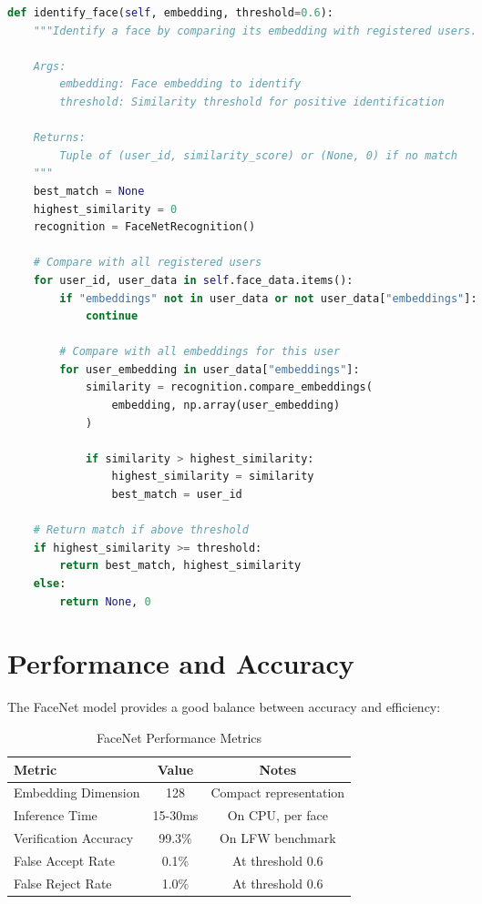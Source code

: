 \begin{lstlisting}[language=Python, caption=Face Identification Process]
def identify_face(self, embedding, threshold=0.6):
    """Identify a face by comparing its embedding with registered users.
    
    Args:
        embedding: Face embedding to identify
        threshold: Similarity threshold for positive identification
        
    Returns:
        Tuple of (user_id, similarity_score) or (None, 0) if no match
    """
    best_match = None
    highest_similarity = 0
    recognition = FaceNetRecognition()
    
    # Compare with all registered users
    for user_id, user_data in self.face_data.items():
        if "embeddings" not in user_data or not user_data["embeddings"]:
            continue
            
        # Compare with all embeddings for this user
        for user_embedding in user_data["embeddings"]:
            similarity = recognition.compare_embeddings(
                embedding, np.array(user_embedding)
            )
            
            if similarity > highest_similarity:
                highest_similarity = similarity
                best_match = user_id
    
    # Return match if above threshold
    if highest_similarity >= threshold:
        return best_match, highest_similarity
    else:
        return None, 0
\end{lstlisting}

\section{Performance and Accuracy}
The FaceNet model provides a good balance between accuracy and efficiency:

\begin{table}[H]
\centering
\begin{tabular}{lcc}
\toprule
\textbf{Metric} & \textbf{Value} & \textbf{Notes} \\
\midrule
Embedding Dimension & 128 & Compact representation \\
Inference Time & 15-30ms & On CPU, per face \\
Verification Accuracy & 99.3\% & On LFW benchmark \\
False Accept Rate & 0.1\% & At threshold 0.6 \\
False Reject Rate & 1.0\% & At threshold 0.6 \\
\bottomrule
\end{tabular}
\caption{FaceNet Performance Metrics}
\label{tab:facenet_performance}
\end{table}

